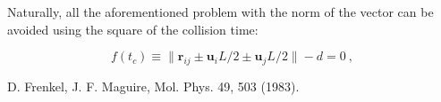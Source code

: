 \documentclass[aps,pre,onecolumn,preprint,showpacs]{revtex4}
\begin{document}
Naturally, all the aforementioned problem with the norm of the vector can be avoided using the
square of the  collision time:

\begin{equation}
  \label{eq:f}
  f(t_c) \equiv \|\mathbf{r}_{ij} \pm \mathbf{u}_{i}L/2 \pm \mathbf{u}_{j}L/2\| - d = 0~,
\end{equation}

\begin{thebibliography}{}

  D. Frenkel, J. F. Maguire, Mol. Phys. 49, 503 (1983).


\end{thebibliography}
\end{document}
